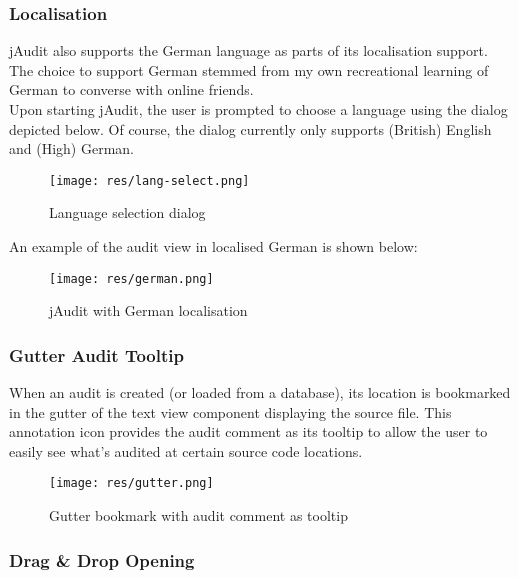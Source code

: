 \documentclass[9pt]{article}
\begin{document}
		\subsubsection{Localisation}

			jAudit also supports the German language as parts of its
			localisation support. The choice to support German stemmed from my
			own recreational learning of German to converse with online
			friends.\\

			Upon starting jAudit, the user is prompted to choose a language
			using the dialog depicted below. Of course, the dialog currently
			only supports (British) English and (High) German.\\

			\begin{figure}[H]
				\centering
				\texttt{[image: res/lang-select.png]}
				\caption{Language selection dialog}
			\end{figure}

			An example of the audit view in localised German is shown below:\\

			\begin{figure}[H]
				\centering
				\texttt{[image: res/german.png]}
				\caption{jAudit with German localisation}
			\end{figure}

		\subsubsection{Gutter Audit Tooltip}

			When an audit is created (or loaded from a database), its location
			is bookmarked in the gutter of the text view component displaying
			the source file. This annotation icon provides the audit comment as
			its tooltip to allow the user to easily see what's audited at
			certain source code locations.\\

			\begin{figure}[H]
				\centering
				\texttt{[image: res/gutter.png]}
				\caption{Gutter bookmark with audit comment as tooltip}
			\end{figure}

		\subsubsection{Drag \& Drop Opening}
			
\end{document}
